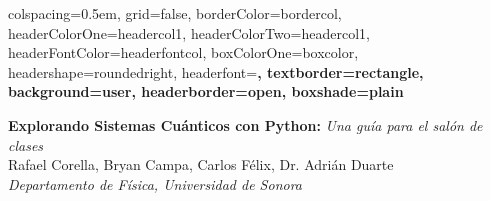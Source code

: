 \documentclass[a0paper,portrait]{baposter}
\begin{document}
\background{ %

}

\begin{poster}{
colspacing=0.5em,
grid=false,
borderColor=bordercol, %
headerColorOne=headercol1, %
headerColorTwo=headercol1, %
headerFontColor=headerfontcol, %
boxColorOne=boxcolor, %
headershape=roundedright, %
headerfont=\large\sf\bf, %
textborder=rectangle,
background=user,
headerborder=open, %
boxshade=plain
}
{}
%

{
\sf
{}\hspace{1em}%
{\LARGE\bfseries Explorando Sistemas Cuánticos con Python: }%
{\Large\itshape Una guía para el salón de clases}\\
{\large Rafael Corella, Bryan Campa, Carlos Félix, Dr. Adrián Duarte}\\
{\normalsize\textit{Departamento de Física, Universidad de Sonora}}
}



\end{poster}
\end{document}
